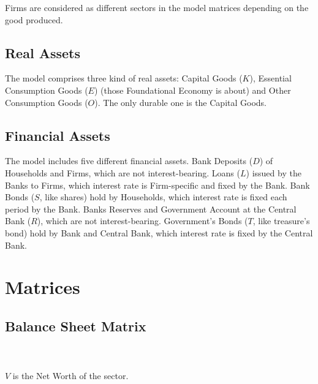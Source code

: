 \documentclass[a4paper, headings=standardclasses]{scrartcl}
\begin{document}
Firms are considered as different sectors in the model matrices depending on the good produced.

\subsection{Real Assets}
The model comprises three kind of real assets: Capital Goods ($K$), Essential Consumption Goods ($E$) (those Foundational Economy is about) and Other Consumption Goods ($O$).
The only durable one is the Capital Goods.

\subsection{Financial Assets}
The model includes five different financial assets.
Bank Deposits ($D$) of Households and Firms, which are not interest-bearing.
Loans ($L$) issued by the Banks to Firms, which interest rate is Firm-specific and fixed by the Bank.
Bank Bonds ($S$, like shares) hold by Households, which interest rate is fixed each period by the Bank.
Banks Reserves and Government Account at the Central Bank ($R$), which are not interest-bearing.
Government's Bonds ($T$, like treasure's bond) hold by Bank and Central Bank, which interest rate is fixed by the Central Bank.

\section{Matrices}
\subsection{Balance Sheet Matrix}
\\ \\
$V$ is the Net Worth of the sector.
\end{document}
